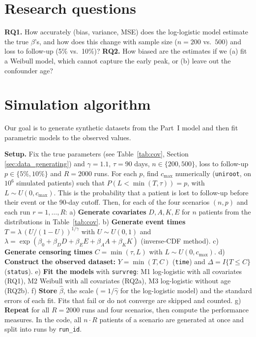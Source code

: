\documentclass[10pt,a4paper]{article}
\begin{document}
\section{Research questions}
\textbf{RQ1.} How accurately (bias, variance, MSE) does the log-logistic model estimate the true $\beta$'s, and how does this change with sample size ($n=200$ vs.\ $500$) and loss to follow-up (5\% vs.\ 10\%)?
\textbf{RQ2.} How biased are the estimates if we (a) fit a Weibull model, which cannot capture the early peak, or (b) leave out the confounder age?

\newpage
\section{Simulation algorithm}
Our goal is to generate synthetic datasets from the Part~I model and then fit parametric models to the observed values.

\textbf{Setup.} Fix the true parameters (see Table~\ref{tab:cov}, Section \ref{sec:data_generating}) and $\gamma=1.1$, $\tau=90$ days, $n\in\{200,500\}$, loss to follow-up $p\in\{5\%,10\%\}$ and $R=2000$ runs. For each $p$, find $c_{\max}$ numerically (\texttt{uniroot}, on $10^6$ simulated patients) such that $P(L<\min(T,\tau))=p$, with $L\sim U(0,c_{\max})$. This is the probability that a patient is lost to follow-up before their event or the 90-day cutoff. Then, for each of the four scenarios $(n,p)$ and each run $r=1,\dots,R$: a) \textbf{Generate covariates} $D,A,K,E$ for $n$ patients from the distributions in Table~\ref{tab:cov}. b) \textbf{Generate event times} $T=\lambda\,(U/(1-U))^{1/\gamma}$ with $U\sim U(0,1)$ and $\lambda=\exp(\beta_0+\beta_D D+\beta_E E+\beta_A A+\beta_K K)$ (inverse-CDF method). c) \textbf{Generate censoring times} $C=\min(\tau,L)$ with $L\sim U(0,c_{\max})$. d) \textbf{Construct the observed dataset:} $Y=\min(T,C)$ (\texttt{time}) and $\Delta=I\{T\le C\}$ (\texttt{status}). e) \textbf{Fit the models} with \texttt{survreg}: M1 log-logistic with all covariates (RQ1), M2 Weibull with all covariates (RQ2a), M3 log-logistic without age (RQ2b). f) \textbf{Store} $\hat\beta$, the scale ($=1/\hat\gamma$ for the log-logistic model) and the standard errors of each fit. Fits that fail or do not converge are skipped and counted. g) \textbf{Repeat} for all $R=2000$ runs and four scenarios, then compute the performance measures. In the code, all $n\cdot R$ patients of a scenario are generated at once and split into runs by \texttt{run\_id}.

\vspace{-12pt}
\end{document}

